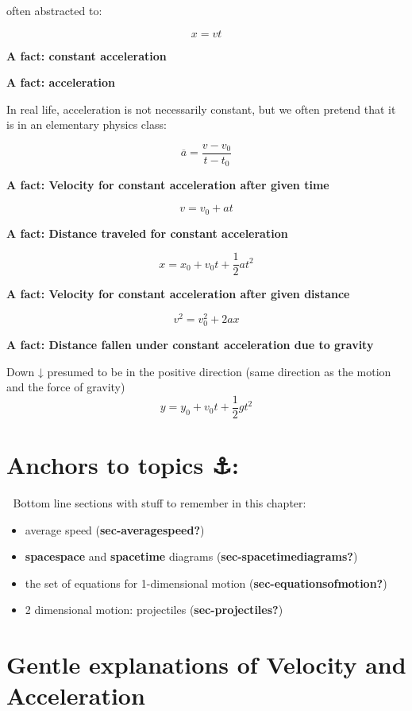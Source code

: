 \documentclass[
]{book}
\providecommand{\tightlist}{%
  \setlength{\itemsep}{0pt}\setlength{\parskip}{0pt}}
\begin{document}
often abstracted to:

\[x=vt\]

\textbf{A fact: constant acceleration}

\textbf{A fact: acceleration}

In real life, acceleration is not necessarily constant, but we often pretend that it is in an elementary physics class:

\[\overline{a} = \frac{v-v_0}{t-t_0}\]

\textbf{A fact: Velocity for constant acceleration after given time}

\[v = v_0 +at\]

\textbf{A fact: Distance traveled for constant acceleration}

\[x = x_0 + v_0t + \dfrac{1}{2} at^2\]

\textbf{A fact: Velocity for constant acceleration after given distance}

\[v^2   = v_0^2 + 2ax\]

\textbf{A fact: Distance fallen under constant acceleration due to gravity}

Down ↓ presumed to be in the positive direction (same direction as the motion and the force of gravity) \[
y = y_0 + v_0t + \dfrac{1}{2} gt^2
\]

\section{Anchors to topics ⚓️:}\label{anchors-to-topics}

🔐 Bottom line sections with stuff to remember in this chapter:

\begin{itemize}
\tightlist
\item
  average speed (\textbf{sec-averagespeed?})
\item
  \textbf{spacespace} and \textbf{spacetime} diagrams (\textbf{sec-spacetimediagrams?})
\item
  the set of equations for 1-dimensional motion (\textbf{sec-equationsofmotion?})
\item
  2 dimensional motion: projectiles (\textbf{sec-projectiles?})
\end{itemize}

\section{Gentle explanations of Velocity and Acceleration 🐇}\label{gentle-explanations-of-velocity-and-acceleration}
\end{document}
